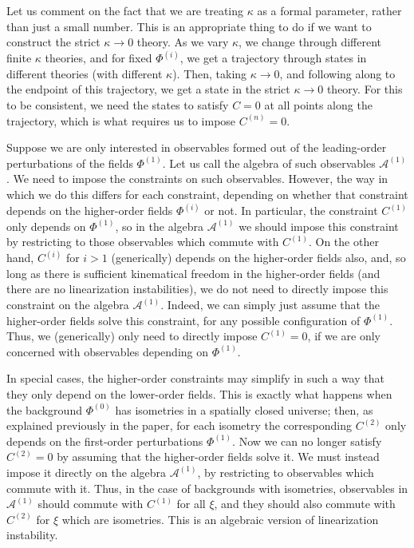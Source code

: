\documentclass[]{jkpaper}
\theoremstyle{plain}
\theoremstyle{definition}
\begin{document}
Let us comment on the fact that we are treating $\kappa$ as a formal parameter, rather than just a small number. This is an appropriate thing to do if we want to construct the strict $\kappa\to 0$ theory. As we vary $\kappa$, we change through different finite $\kappa$ theories, and for fixed $\Phi^{(i)}$, we get a trajectory through states in different theories (with different $\kappa$). Then, taking $\kappa\to 0$, and following along to the endpoint of this trajectory, we get a state in the strict $\kappa\to 0$ theory. For this to be consistent, we need the states to satisfy $C=0$ at all points along the trajectory, which is what requires us to impose $C^{(n)}=0$.

Suppose we are only interested in observables formed out of the leading-order perturbations of the fields $\Phi^{(1)}$. Let us call the algebra of such observables $\mathcal{A}^{(1)}$. We need to impose the constraints on such observables. However, the way in which we do this differs for each constraint, depending on whether that constraint depends on the higher-order fields $\Phi^{(i)}$ or not. In particular, the constraint $C^{(1)}$ only depends on $\Phi^{(1)}$, so in the algebra $\mathcal{A}^{(1)}$ we should impose this constraint by restricting to those observables which commute with $C^{(1)}$. On the other hand, $C^{(i)}$ for $i>1$ (generically) depends on the higher-order fields also, and, so long as there is sufficient kinematical freedom in the higher-order fields (and there are no linearization instabilities), we do not need to directly impose this constraint on the algebra $\mathcal{A}^{(1)}$. Indeed, we can simply just assume that the higher-order fields solve this constraint, for any possible configuration of $\Phi^{(1)}$. Thus, we (generically) only need to directly impose $C^{(1)}=0$, if we are only concerned with observables depending on $\Phi^{(1)}$.

In special cases, the higher-order constraints may simplify in such a way that they only depend on the lower-order fields. This is exactly what happens when the background $\Phi^{(0)}$ has isometries in a spatially closed universe; then, as explained previously in the paper, for each isometry the corresponding $C^{(2)}$ only depends on the first-order perturbations $\Phi^{(1)}$. Now we can no longer satisfy $C^{(2)}=0$ by assuming that the higher-order fields solve it. We must instead impose it directly on the algebra $\mathcal{A}^{(1)}$, by restricting to observables which commute with it. Thus, in the case of backgrounds with isometries, observables in $\mathcal{A}^{(1)}$ should commute with $C^{(1)}$ for all $\xi$, and they should also commute with $C^{(2)}$ for $\xi$ which are isometries. This is an algebraic version of linearization instability.
\end{document}
